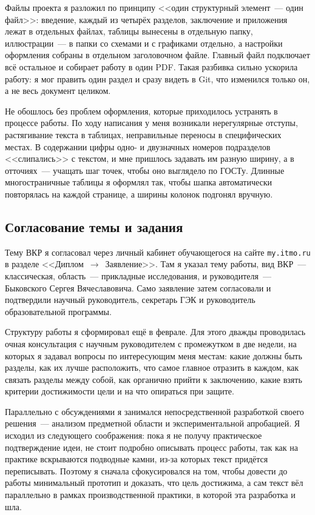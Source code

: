 Файлы проекта я разложил по принципу <<один структурный элемент~--- один
файл>>: введение, каждый из четырёх разделов, заключение и приложения
лежат в отдельных файлах, таблицы вынесены в отдельную папку,
иллюстрации~--- в папки со схемами и с графиками отдельно, а настройки
оформления собраны в отдельном заголовочном файле. Главный файл
подключает всё остальное и собирает работу в один PDF. Такая разбивка
сильно ускорила работу: я мог править один раздел и сразу видеть в Git,
что изменился только он, а не весь документ целиком.

Не обошлось без проблем оформления, которые приходилось устранять в
процессе работы. По ходу написания у меня возникали нерегулярные
отступы, растягивание текста в таблицах, неправильные переносы в
специфических местах. В содержании цифры одно- и двузначных номеров
подразделов <<слипались>> с текстом, и мне пришлось задавать им разную
ширину, а в отточиях~--- учащать шаг точек, чтобы оно выглядело по ГОСТу.
Длинные многостраничные таблицы я оформлял так, чтобы шапка
автоматически повторялась на каждой странице, а ширины колонок подгонял
вручную.

\subsection{Согласование темы и задания}

Тему ВКР я согласовал через личный кабинет обучающегося на сайте
\texttt{my.itmo.ru} в разделе <<Диплом~$\to$~Заявление>>. Там я указал
тему работы, вид ВКР~--- классическая, область~--- прикладные
исследования, и руководителя~--- Быковского Сергея Вячеславовича. Само
заявление затем согласовали и подтвердили научный руководитель,
секретарь ГЭК и руководитель образовательной программы.

Структуру работы я сформировал ещё в феврале. Для этого дважды
проводилась очная консультация с научным руководителем с промежутком в
две недели, на которых я задавал вопросы по интересующим меня местам:
какие должны быть разделы, как их лучше расположить, что самое главное
отразить в каждом, как связать разделы между собой, как органично прийти
к заключению, какие взять критерии достижимости цели и на что опираться
при защите.

Параллельно с обсуждениями я занимался непосредственной разработкой
своего решения~--- анализом предметной области и экспериментальной
апробацией. Я исходил из следующего соображения: пока я не получу
практическое подтверждение идеи, не стоит подробно описывать процесс
работы, так как на практике вскрываются подводные камни, из-за которых
текст придётся переписывать. Поэтому я сначала сфокусировался на том,
чтобы довести до работы минимальный прототип и доказать, что цель
достижима, а сам текст вёл параллельно в рамках производственной
практики, в которой эта разработка и шла.

